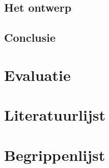 \documentclass[a4paper,11pt, twoside]{article}
\begin{document}
    \subsection{Het ontwerp}

    \subsection{Conclusie}

    \section{Evaluatie}

    \section{Literatuurlijst}

    \newpage
    \appendix
    \section{Begrippenlijst}
\end{document}
